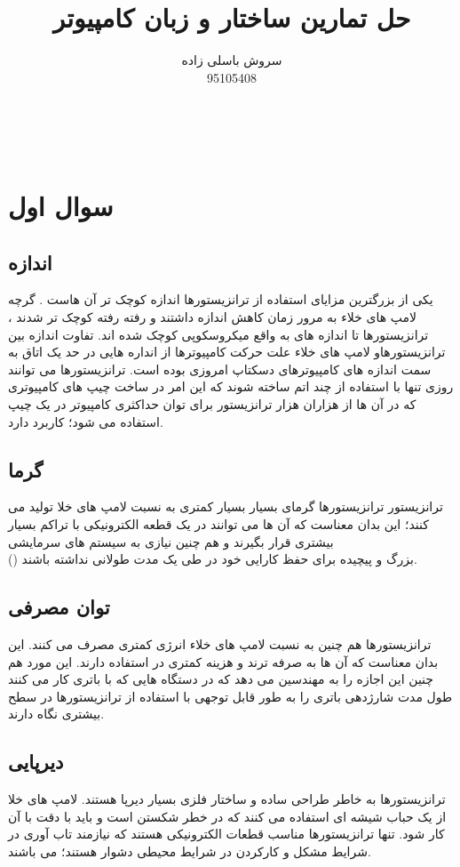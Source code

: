 \documentclass{article}
\title{ حل تمارین ساختار و زبان کامپیوتر}
\author{سروش باسلی زاده\\95105408}
\begin{document}
\maketitle
\vspace{-8mm}
\hrulefill
\\[5mm]

\section{سوال اول}
\subsection{اندازه}
یکی از بزرگترین مزایای استفاده از ترانزیستورها اندازه کوچک تر آن هاست . گرچه لامپ های خلاء به مرور زمان کاهش اندازه داشتند و رفته رفته کوچک تر شدند ، ترانزیستورها  تا اندازه های به واقع میکروسکوپی کوچک شده اند. تفاوت اندازه بین ترانزیستورهاو لامپ های خلاء علت حرکت کامپیوترها از انداره هایی در حد یک اتاق به سمت اندازه های کامپیوترهای دسکتاپ امروزی بوده است. ترانزیستورها می توانند روزی تنها با استفاده از چند اتم ساخته شوند که این امر در ساخت چیپ های کامپیوتری که در آن ها از هزاران هزار ترانزیستور برای توان حداکثری کامپیوتر در یک چیپ استفاده می شود؛ کاربرد دارد.
\subsection{گرما}
ترانزیستور ترانزیستورها گرمای بسیار بسیار کمتری به نسبت لامپ های خلا تولید می کنند؛ این بدان معناست که آن ها می توانند در یک قطعه الکترونیکی با تراکم بسیار بیشتری قرار بگیرند و هم چنین نیازی به سیستم های سرمایشی \\() بزرگ و پیچیده برای حفظ کارایی خود در طی یک مدت طولانی نداشته باشند.
\subsection{توان مصرفی}
ترانزیستورها هم چنین به نسبت لامپ های خلاء انرژی کمتری مصرف می کنند. این بدان معناست که آن ها به صرفه ترند و هزینه کمتری در استفاده دارند. این مورد هم چنین این اجازه را به مهندسین می دهد که در دستگاه هایی که با باتری کار می کنند طول مدت شارژدهی باتری را به طور قابل توجهی با استفاده از ترانزیستورها در سطح بیشتری نگاه دارند.
\subsection{دیرپایی}
ترانزیستورها به خاطر طراحی ساده و ساختار فلزی بسیار دیرپا هستند. لامپ های خلا از یک حباب شیشه ای استفاده می کنند که در خطر شکستن است و باید با دقت با آن کار شود. تنها ترانزیستورها مناسب قطعات الکترونیکی هستند که نیازمند تاب آوری در شرایط مشکل و کارکردن در شرایط محیطی دشوار هستند؛ می باشند. 
\end{document}
